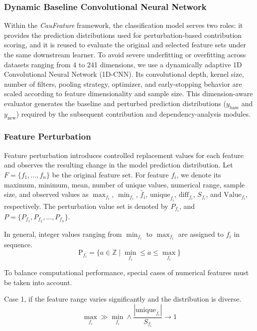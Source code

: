 \documentclass[journal]{IEEEtran}
\begin{document}
\subsubsection{Dynamic Baseline Convolutional Neural Network}
\label{sec:cnn_baseline}
Within the \textit{CauFeature} framework, the classification model serves two roles: it provides the prediction distributions used for perturbation-based contribution scoring, and it is reused to evaluate the original and selected feature sets under the same downstream learner. To avoid severe underfitting or overfitting across datasets ranging from 4 to 241 dimensions, we use a dynamically adaptive 1D Convolutional Neural Network (1D-CNN). Its convolutional depth, kernel size, number of filters, pooling strategy, optimizer, and early-stopping behavior are scaled according to feature dimensionality and sample size. This dimension-aware evaluator generates the baseline and perturbed prediction distributions ($y_{\text{base}}$ and $y_{\text{new}}$) required by the subsequent contribution and dependency-analysis modules.

\subsubsection{Feature Perturbation}
Feature perturbation introduces controlled replacement values for each feature and observes the resulting change in the model prediction distribution. Let $F=\{f_1,\ldots,f_n\}$ be the original feature set. For feature $f_i$, we denote its maximum, minimum, mean, number of unique values, numerical range, sample size, and observed values as \(\max_{f_i}\), \(\min_{f_i}\), \(\bar{f}_i\), \(\text{unique}_{f_i}\), \(\text{diff}_{f_i}\), \(S_{f_i}\), and \(\text{Value}_{f_i}\), respectively. The perturbation value set is denoted by \(P_{f_i}\), and \(P=\{P_{f_1},P_{f_2},\ldots,P_{f_n}\}\).

In general, integer values ranging from $\min_{f_i}$ to $\max_{f_i}$ are assigned to ${f_i}$ in sequence.
\begin{equation}
\text{P}_{f_i}=\{a\in\mathbb{Z}\mid \min_{f_i}\leqslant a\leqslant \max_{f_i}\} 
\end{equation}

To balance computational performance, special cases of numerical features must be taken into account. 

Case 1, if the feature range varies significantly and the distribution is diverse. 
\begin{equation}
\max_{f_i} \gg \min_{f_i} \land \frac{|\text{unique}_{f_i}|}{S_{f_i}} \to 1
\end{equation}
\end{document}
